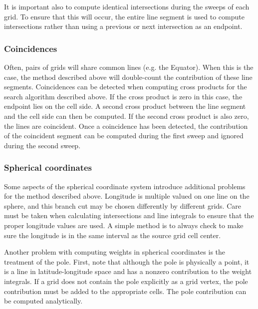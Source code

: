 \begin{description}
     It is important also to compute identical intersections during the sweeps
     of each grid.  To ensure that this will occur, the entire line segment is
     used to compute intersections rather than using a previous or next
     intersection as an endpoint.

\subsubsection{Coincidences}

     Often, pairs of grids will share common lines (e.g. the Equator).  When
     this is the case, the method described above will double-count the
     contribution of these line segments.  Coincidences can be detected when
     computing cross products for the search algorithm described above.  If
     the cross product is zero in this case, the endpoint lies on the cell
     side.  A second cross product between the line segment and the cell side
     can then be computed.  If the second cross product is also zero, the
     lines are coincident.  Once a coincidence has been detected, the
     contribution of the coincident segment can be computed during the
     first sweep and ignored during the second sweep.

\subsubsection{Spherical coordinates}\label{sec-sphere}

     Some aspects of the spherical coordinate system introduce additional
     problems for the method described above.  Longitude is multiple valued
     on one line on the sphere, and this branch cut may be chosen differently
     by different grids.  Care must be taken when calculating intersections 
     and line integrals to ensure that the proper longitude values are used.
     A simple method is to always check to make sure the longitude is in the
     same interval as the source grid cell center.

     Another problem with computing weights in spherical coordinates is the
     treatment of the pole.  First, note that although the pole is physically
     a point, it is a line in latitude-longitude space and has a nonzero
     contribution to the weight integrals.  If a grid does not contain the
     pole explicitly as a grid vertex, the pole contribution must be added
     to the appropriate cells.  The pole contribution can be computed analytically.


\end{description}
